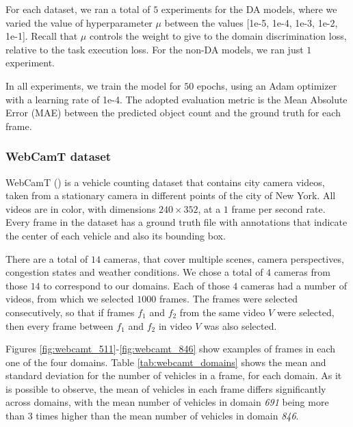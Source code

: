For each dataset, we ran a total of $5$ experiments for the DA models, where we varied the value of hyperparameter $\mu$ between the values [1e-5, 1e-4, 1e-3, 1e-2, 1e-1]. Recall that $\mu$ controls the weight to give to the domain discrimination loss, relative to the task execution loss. For the non-DA models, we ran just $1$ experiment.

In all experiments, we train the model for $50$ epochs, using an Adam optimizer with a learning rate of 1e-4. The adopted evaluation metric is the Mean Absolute Error (MAE) between the predicted object count and the ground truth for each frame.

\subsubsection{WebCamT dataset}

WebCamT (\citet{Zhang2017b}) is a vehicle counting dataset that contains city camera videos, taken from a stationary camera in different points of the city of New York. All videos are in color, with dimensions $240 \times 352$, at a $1$ frame per second rate. Every frame in the dataset has a ground truth file with annotations that indicate the center of each vehicle and also its bounding box. 

There are a total of $14$ cameras, that cover multiple scenes, camera perspectives, congestion states  and weather conditions. We chose a total of $4$ cameras from those $14$ to correspond to our domains. Each of those $4$ cameras had a number of videos, from which we selected $1000$ frames. The frames were selected consecutively, so that if frames $f_1$ and $f_2$ from the same video $V$ were selected, then every frame between $f_1$ and $f_2$ in video $V$ was also selected.

Figures \ref{fig:webcamt_511}-\ref{fig:webcamt_846} show examples of frames in each one of the four domains. Table \ref{tab:webcamt_domains} shows the mean and standard deviation for the number of vehicles in a frame, for each domain. As it is possible to observe, the mean of vehicles in each frame differs significantly across domains, with the mean number of vehicles in domain \textit{691} being more than $3$ times higher than the mean number of vehicles in domain \textit{846}.



